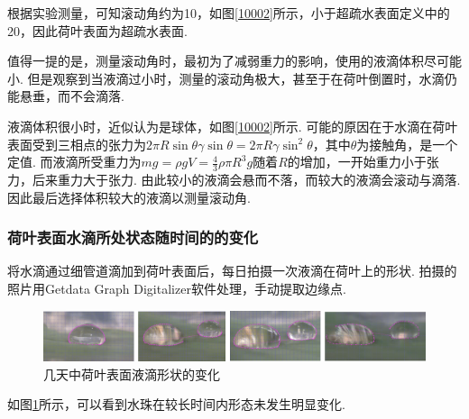 \documentclass[a4paper,12pt]{article}%
\begin{document}
\begin{spacing}{1.528}%
根据实验测量，可知滚动角约为10\degree，如图\ref{10002}所示，小于超疏水表面定义中的20\degree，因此荷叶表面为超疏水表面. 

值得一提的是，测量滚动角时，最初为了减弱重力的影响，使用的液滴体积尽可能小. 
但是观察到当液滴过小时，测量的滚动角极大，甚至于在荷叶倒置时，水滴仍能悬垂，而不会滴落. 

液滴体积很小时，近似认为是球体，如图\ref{10002}所示. 
可能的原因在于水滴在荷叶表面受到三相点的张力为$2\pi R\sin \theta \gamma \sin \theta =2\pi R\gamma \sin ^2 \theta $，其中$\theta$为接触角，是一个定值. 
而液滴所受重力为$mg=\rho g V=\frac{4}{3}\rho \pi R^3 g$随着$R$的增加，一开始重力小于张力，后来重力大于张力. 
由此较小的液滴会悬而不落，而较大的液滴会滚动与滴落. 
因此最后选择体积较大的液滴以测量滚动角. 
\end{spacing}

\subsubsection{荷叶表面水滴所处状态随时间的的变化}
\begin{spacing}{1.528}%
将水滴通过细管道滴加到荷叶表面后，每日拍摄一次液滴在荷叶上的形状. 
拍摄的照片用Getdata Graph Digitalizer软件处理，手动提取边缘点. 
\end{spacing}
\begin{figure}[H]
    \centering
    \includegraphics[scale=0.3]{图像/变化.png}
    \caption{几天中荷叶表面液滴形状的变化}\label{12315}
\end{figure}
如图\ref{12315}所示，可以看到水珠在较长时间内形态未发生明显变化. 
\end{document}
